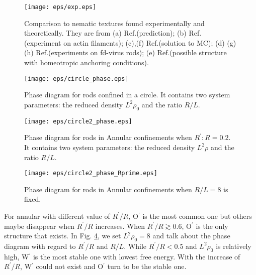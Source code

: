 \documentclass[prl,twocolumn,preprintnumbers,reprint]{revtex4}
\begin{document}
\begin{figure}[!t]\centering
\texttt{[image: eps/exp.eps]}
\caption{Comparison to nematic textures found experimentally and theoretically. They are from (a) Ref.\cite{Ondris1993Curvature}(prediction); (b) Ref.\cite{Silva2011Self}(experiment on actin filaments); (c),(f) Ref.\cite{G2016Finite}(solution to MC); (d) (g) (h) Ref.\cite{G2016Finite}(experiments on fd-virus rods); (e) Ref.\cite{De2009Topological}(possible structure with homeotropic anchoring conditions). } \label{exp}
\end{figure}

\begin{figure}[!t]\centering
\texttt{[image: eps/circle\_phase.eps]}
\caption{Phase diagram for rods confined in a circle. It contains two system parameters: the reduced density $L^2\rho_0$ and the ratio $R/L$.} \label{P3}
\end{figure}


\begin{figure}[!t]\centering
\texttt{[image: eps/circle2\_phase.eps]}
\caption{Phase diagram for rods in Annular confinements when $R^\prime:R=0.2$. It contains two system parameters: the reduced density $L^2\rho$ and the ratio $R/L$.} \label{Q3}
\end{figure}

\begin{figure}[!t]\centering
\texttt{[image: eps/circle2\_phase\_Rprime.eps]}
\caption{Phase diagram for rods in Annular confinements when $R/L=8$ is fixed.} \label{Q4}
\end{figure}

For annular with different value of $R^\prime/R$, O$^\prime$ is the most common one but others maybe disappear when $R^\prime/R$ increases. When $R^\prime/R\gtrsim0.6$, O$^\prime$ is the only structure that exists. In Fig. \ref{Q4}, we set $L^2\rho_0=8$ and talk about the phase diagram with regard to $R^\prime/R$ and $R/L$. While $R^\prime/R<0.5$ and $L^2\rho_0$ is relatively high, W$^\prime$ is the most stable one with lowest free energy. With the increase of $R^\prime/R$, W$^\prime$ could not exist and O$^\prime$ turn to be the stable one.
\end{document}
